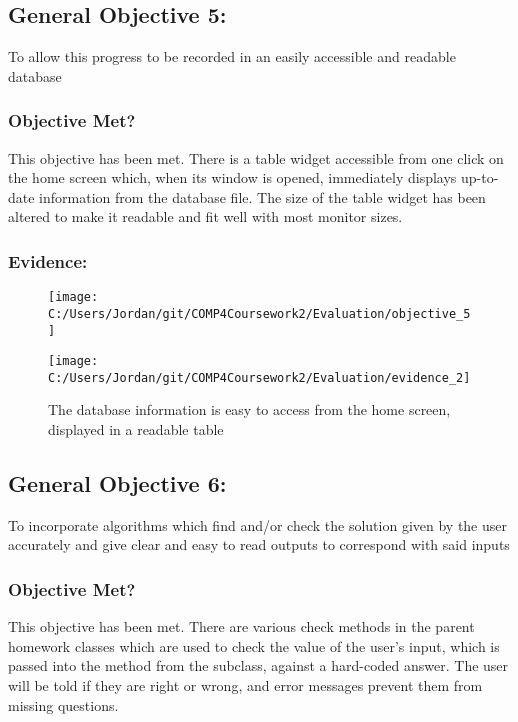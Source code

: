 \subsection{General Objective 5: }

To allow this progress to be recorded in an easily accessible and readable database

\subsubsection{Objective Met?}

This objective has been met. There is a table widget accessible from one click on the home screen which, when its window is opened, immediately displays up-to-date information from the database file. The size of the table widget has been altered to make it readable and fit well with most monitor sizes.

\subsubsection{Evidence: }

\begin{figure}[H]
	\texttt{[image: C:/Users/Jordan/git/COMP4Coursework2/Evaluation/objective\_5]}
\end{figure}

\begin{figure}[H]
	\texttt{[image: C:/Users/Jordan/git/COMP4Coursework2/Evaluation/evidence\_2]}
	\caption{The database information is easy to access from the home screen, displayed in a readable table}
\end{figure}

\subsection{General Objective 6: }

To incorporate algorithms which find and/or check the solution given by the user accurately and give clear and easy to read outputs to correspond with said inputs

\subsubsection{Objective Met?}

This objective has been met. There are various check methods in the parent homework classes which are used to check the value of the user's input, which is passed into the method from the subclass, against a hard-coded answer. The user will be told if they are right or wrong, and error messages prevent them from missing questions.

